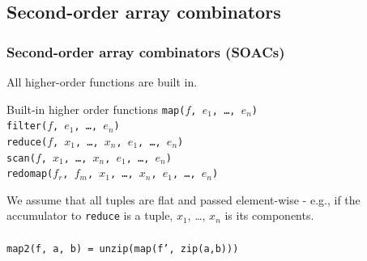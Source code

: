 \documentclass{beamer}
\begin{document}
\subsection{Second-order array combinators}

\begin{frame}[fragile,t]
  \frametitle{Second-order array combinators (SOACs)}

  All higher-order functions are built in.

  \begin{block}{Built-in higher order functions}
    {\tt map($f$, $e_{1}$, \ldots, $e_{n}$)} \\
    {\tt filter($f$, $e_{1}$, \ldots, $e_{n}$)} \\
    {\tt reduce($f$, $x_{1}$, \ldots, $x_{n}$, $e_{1}$, \ldots, $e_{n}$)} \\
    {\tt scan($f$, $x_{1}$, \ldots, $x_{n}$, $e_{1}$, \ldots, $e_{n}$)} \\
    {\tt redomap($f_{r}$, $f_{m}$, $x_{1}$, \ldots, $x_{n}$, $e_{1}$, \ldots, $e_{n}$)} \\
  \end{block}

  We assume that all tuples are flat and passed element-wise - e.g., if
  the accumulator to {\tt reduce} is a tuple, $x_{1}$, \ldots, $x_{n}$
  is its components.
\pause
\\\hfill\\
  {\tt map2(f, a, b) = unzip(map(f', zip(a,b)))}


\end{frame}
\end{document}
